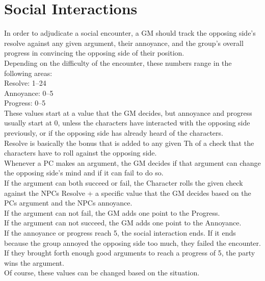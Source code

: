 \chapter{Social Interactions}\label{ch:socialInteractions}
In order to adjudicate a social encounter, a GM should track the opposing side's resolve against any given argument, their annoyance, and the group's overall progress in convincing the opposing side of their position. \\
Depending on the difficulty of the encounter, these numbers range in the following areas:\\
Resolve: 1--24\\
Annoyance: 0--5\\
Progress: 0--5\\
These values start at a value that the GM decides, but annoyance and progress usually start at 0, unless the characters have interacted with the opposing side previously, or if the opposing side has already heard of the characters.\\
Resolve is basically the bonus that is added to any given Th of a check that the characters have to roll against the opposing side.\\
Whenever a PC makes an argument, the GM decides if that argument can change the opposing side's mind and if it can fail to do so.\\
If the argument can both succeed or fail, the Character rolls the given check against the NPCs Resolve + a specific value that the GM decides based on the PCs argument and the NPCs annoyance.\\
If the argument can not fail, the GM adds one point to the Progress.\\
If the argument can not succeed, the GM adds one point to the Annoyance.\\
If the annoyance or progress reach 5, the social interaction ends.
If it ends because the group annoyed the opposing side too much, they failed the encounter.
If they brought forth enough good arguments to reach a progress of 5, the party wins the argument.\\
Of course, these values can be changed based on the situation.